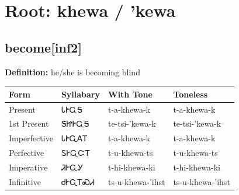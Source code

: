 \documentclass{article}%
\begin{document}
%
\normalsize%
\section*{Root: khewa / 'kewa}%
\subsection*{become[inf2]}%
\textbf{Definition: }%
he/she is becoming blind%
\\[0.5em]%
\begin{tabular}{|l|l|l|l|}%
\hline%
\textbf{Form}&\textbf{Syllabary}&\textbf{With Tone}&\textbf{Toneless}\\%
\hline%
Present&ᏓᎨᏩᎦ&t{-}a{-}khewa{-}k&t{-}a{-}khewa{-}k\\%
1st Present&ᏕᏥᎨᏩᎦ&te{-}tsi{-}'kewa{-}k&te{-}tsi{-}'kewa{-}k\\%
Imperfective&ᏓᎨᏩᎪᎢ&t{-}a{-}khewa{-}k&t{-}a{-}khewa{-}k\\%
Perfective&ᏚᎨᏩᏨᎢ&t{-}u{-}khewa{-}ts&t{-}u{-}khewa{-}ts\\%
Imperative&ᏘᎨᏩᎩ&t{-}hi{-}khewa{-}ki&t{-}hi{-}khewa{-}ki\\%
Infinitive&ᏧᎨᏩᎢᏍᏗ&ts{-}u{-}khewa{-}'ihst&ts{-}u{-}khewa{-}'ihst\\%
\hline%
\end{tabular}%
\\[1em]%
\end{document}
